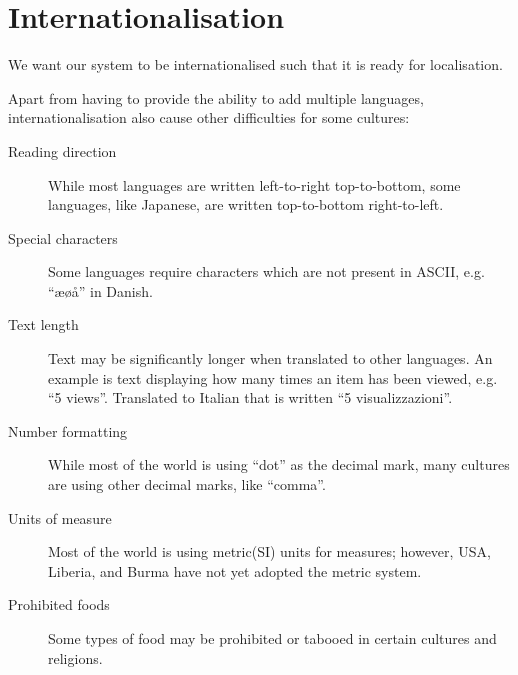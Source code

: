 \section{Internationalisation}
We want our system to be internationalised such that it is ready for localisation.

Apart from having to provide the ability to add multiple languages, internationalisation also cause other difficulties for some cultures:

\begin{description}
  \item[Reading direction] While most languages are written left-to-right top-to-bottom, some languages, like Japanese, are written top-to-bottom right-to-left.
  \item[Special characters] Some languages require characters which are not present in ASCII, e.g. ``æøå'' in Danish.
  \item[Text length] Text may be significantly longer when translated to other languages. An example is text displaying how many times an item has been viewed, e.g. ``5 views''. Translated to Italian that is written ``5 visualizzazioni''\cite{wordlength}.
  \item[Number formatting] While most of the world is using ``dot'' as the decimal mark, many cultures are using other decimal marks, like ``comma''.
  \item[Units of measure] Most of the world is using metric(SI) units for measures; however, USA, Liberia, and Burma have not yet adopted the metric system\cite{unitsfactbook}.
  \item[Prohibited foods] Some types of food may be prohibited or tabooed in certain cultures and religions.
\end{description}